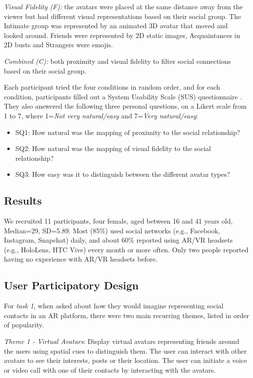 \textit{Visual Fidelity (F):} the avatars were placed at the same distance away from the viewer but had different visual representations based on their social group. The Intimate group was represented by an animated 3D avatar that moved and looked around. Friends were represented by 2D static images, Acquaintances in 2D busts and Strangers were emojis.

\textit{Combined (C):} both proximity and visual fidelity to filter social connections based on their social group.

Each participant tried the four conditions in random order, and for each condition, participants filled out a System Usability Scale (SUS) questionnaire \cite{brooke1996sus}. They also answered the following three personal questions, on a Likert scale from 1 to 7, where 1=\textit{Not very natural/easy} and 7=\textit{Very natural/easy}:

\begin{itemize}
    \item SQ1: How natural was the mapping of proximity to the social relationship?
    \item SQ2: How natural was the mapping of visual fidelity to the social relationship?
    \item SQ3: How easy was it to distinguish between the different avatar types?
\end{itemize}

\subsection{Results}

We recruited 11 participants, four female, aged between 16 and 41 years old, Median=29, SD=5.89. Most (85\%) used social networks (e.g., Facebook, Instagram, Snapchat) daily, and about 60\% reported using AR/VR headsets (e.g., HoloLens, HTC Vive) every month or more often. Only two people reported having no experience with AR/VR headsets before.

\subsection{User Participatory Design}

For \textit{task 1}, when asked about how they would imagine representing social contacts in an AR platform, there were two main recurring themes, listed in order of popularity.

\textit{Theme 1 - Virtual Avatars}: Display virtual avatars representing friends around the users using spatial cues to distinguish them. The user can interact with other avatars to see their interests, posts or their location. The user can initiate a voice or video call with one of their contacts by interacting with the avatars.

